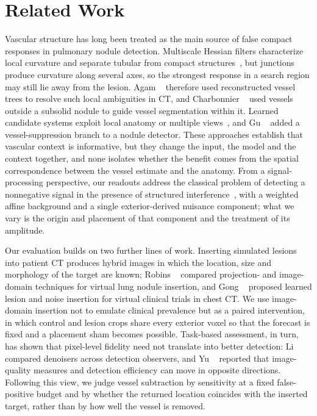 \section{Related Work}
\label{sec:related}
Vascular structure has long been treated as the main source of false compact responses in pulmonary nodule detection. Multiscale Hessian filters characterize local curvature and separate tubular from compact structures~\cite{frangi1998,sato1998,li2003}, but junctions produce curvature along several axes, so the strongest response in a search region may still lie away from the lesion. Agam \etal{}~\cite{agam2005} therefore used reconstructed vessel trees to resolve such local ambiguities in CT, and Charbonnier \etal{}~\cite{charbonnier2018} used vessels outside a subsolid nodule to guide vessel segmentation within it. Learned candidate systems exploit local anatomy or multiple views~\cite{wu2010,setio2016}, and Gu \etal{}~\cite{gu2020} added a vessel-suppression branch to a nodule detector. These approaches establish that vascular context is informative, but they change the input, the model and the context together, and none isolates whether the benefit comes from the spatial correspondence between the vessel estimate and the anatomy. From a signal-processing perspective, our readouts address the classical problem of detecting a nonnegative signal in the presence of structured interference~\cite{scharf1994}, with a weighted affine background and a single exterior-derived nuisance component; what we vary is the origin and placement of that component and the treatment of its amplitude.

Our evaluation builds on two further lines of work. Inserting simulated lesions into patient CT produces hybrid images in which the location, size and morphology of the target are known; Robins \etal{}~\cite{robins2017insertion} compared projection- and image-domain techniques for virtual lung nodule insertion, and Gong \etal{}~\cite{gong2021insertion} proposed learned lesion and noise insertion for virtual clinical trials in chest CT. We use image-domain insertion not to emulate clinical prevalence but as a paired intervention, in which control and lesion crops share every exterior voxel so that the forecast is fixed and a placement sham becomes possible. Task-based assessment, in turn, has shown that pixel-level fidelity need not translate into better detection: Li \etal{}~\cite{li2021denoise} compared denoisers across detection observers, and Yu \etal{}~\cite{yu2023denoise} reported that image-quality measures and detection efficiency can move in opposite directions. Following this view, we judge vessel subtraction by sensitivity at a fixed false-positive budget and by whether the returned location coincides with the inserted target, rather than by how well the vessel is removed.
